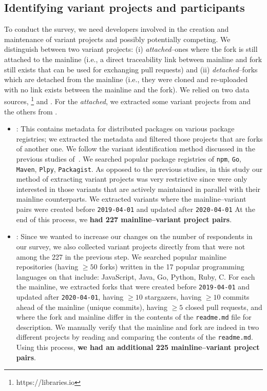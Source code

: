 

\subsection{Identifying variant projects and participants}
\label{sec:forks_and_participants}
To conduct the survey, we need developers involved in the creation and maintenance of variant projects and possibly potentially competing. We distinguish between two variant projects: (i) \emph{attached}--ones where the fork is still attached to the mainline (i.e., a direct traceability link between mainline and fork still exists that can be used for exchanging pull requests) and (ii) \emph{detached}--forks which are detached from the mainline (i.e., they were cloned and re-uploaded with no link exists between the mainline and the fork).
We relied on two data sources, \librariesio\footnote{https://libraries.io} and \gh.
For the \emph{attached}, we extracted some variant projects from \librariesio and the others from \gh.
\begin{itemize}
\item \librariesio: This contains metadata for distributed packages on various package registries; we extracted the metadata and filtered those projects that are forks of another one. We follow the variant identification method discussed in the previous studies of~\cite{businge:emse:2021,businge:benevol:2020}. We searched popular package registries of \texttt{npm}, \texttt{Go}, \texttt{Maven}, \texttt{Plpy}, \texttt{Packagist}.
As opposed to the previous studies, in this study our method of extracting variant projects was very restrictive since were only interested in those variants that are actively maintained in parallel with their mainline counterparts. We extracted variants where the mainline--variant pairs were created before \texttt{2019-04-01} and updated after \texttt{2020-04-01}
At the end of this process, we \textbf{had 227 mainline–variant project pairs}.

\item \gh: Since we wanted to increase our changes on the number of respondents in our survey, we also collected variant projects directly from \gh that were not among the 227 in the previous step. We searched popular mainline repositories (having $\geq 50$ forks) written in the 17 popular programming languages on \gh that include: JavaScript, Java, Go, Python, Ruby, C. For each the mainline, we extracted forks that were created before \texttt{2019-04-01} and updated after \texttt{2020-04-01}, having $\geq 10$ stargazers, having $\geq 10$ commits ahead of the mainline (unique commits), having $\geq 5$ closed pull requests, and where the fork and mainline differ in the contents of the \texttt{readme.md} file for description. We manually verify that the mainline and fork are indeed in two different projects by reading and comparing the contents of the \texttt{readme.md}. Using this process, \textbf{we had an additional 225 mainline–variant project pairs}.
\end{itemize}

